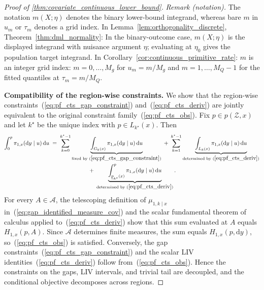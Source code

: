 \begin{proof}[Proof of \cref{thm:covariate_continuous_lower_bound}]
\noindent\textit{Remark (notation).} The notation $m(X;\eta)$ denotes the binary lower-bound integrand, whereas bare $m$ in $u_m$ or $\tau_m$ denotes a grid index. In Lemma~\ref{lem:orthogonality_discrete}, Theorem~\ref{thm:dml_normality}: In the binary-outcome case, $m(X;\eta)$ is the displayed integrand with nuisance argument $\eta$; evaluating at $\eta_0$ gives the population target integrand. In Corollary~\ref{cor:continuous_primitive_rate}: $m$ is an integer grid index: $m=0,\ldots,M_g$ for $u_m=m/M_g$ and $m=1,\ldots,M_Q-1$ for the fitted quantiles at $\tau_m=m/M_Q$.


\medskip
\noindent\textbf{Compatibility of the region-wise constraints.}
We show that the region-wise constraints~(\ref{eq:pf_cts_gap_constraint}) and~(\ref{eq:pf_cts_deriv}) are jointly equivalent to the original constraint family~(\ref{eq:pf_cts_obs}). Fix $p \in p(\mathcal{Z}, x)$ and let $k^\star$ be the unique index with $p \in L_{k^\star}(x)$. Then
\begin{multline*}
    \int_0^p \pi_{1,x}(\mathrm{d}y\mid u)\,\mathrm{d}u \;=\; \sum_{k=0}^{k^\star-1}\underbrace{\int_{G_k(x)}\pi_{1,x}(\mathrm{d}y\mid u)\,\mathrm{d}u}_{\text{fixed by }(\ref{eq:pf_cts_gap_constraint})} \;+\; \sum_{k=1}^{k^\star-1}\underbrace{\int_{L_k(x)}\pi_{1,x}(\mathrm{d}y\mid u)\,\mathrm{d}u}_{\text{determined by }(\ref{eq:pf_cts_deriv})} \\
    \;+\; \underbrace{\int_{\underline{p}_{k^\star}(x)}^p\pi_{1,x}(\mathrm{d}y\mid u)\,\mathrm{d}u}_{\text{determined by }(\ref{eq:pf_cts_deriv})}.
\end{multline*}
For every $A\in\mathcal A$, the telescoping definition of $\mu_{1,k\mid x}$ in~(\ref{eq:gap_identified_measure_cov}) and the scalar fundamental theorem of calculus applied to~(\ref{eq:pf_cts_deriv}) show that this sum evaluated at $A$ equals $H_{1,x}(p,A)$. Since $\mathcal A$ determines finite measures, the sum equals $H_{1,x}(p,\mathrm dy)$, so~(\ref{eq:pf_cts_obs}) is satisfied. Conversely, the gap constraints~(\ref{eq:pf_cts_gap_constraint}) and the scalar LIV identities~(\ref{eq:pf_cts_deriv}) follow from~(\ref{eq:pf_cts_obs}). Hence the constraints on the gaps, LIV intervals, and trivial tail are decoupled, and the conditional objective decomposes across regions.


\end{proof}
